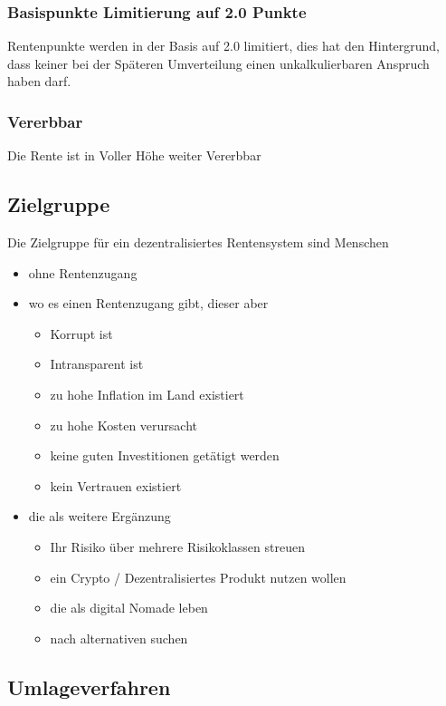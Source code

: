 \subsubsection*{Basispunkte Limitierung auf 2.0 Punkte}

Rentenpunkte werden in der Basis auf 2.0 limitiert, dies hat den Hintergrund, dass keiner bei der Späteren Umverteilung einen unkalkulierbaren Anspruch haben darf.

\subsubsection*{Vererbbar}

Die Rente ist in Voller Höhe weiter Vererbbar




\subsection{Zielgruppe}

Die Zielgruppe für ein dezentralisiertes Rentensystem sind Menschen

\begin{itemize}
\item ohne Rentenzugang
\item wo es einen Rentenzugang gibt, dieser aber 
 \begin{itemize}
 \item Korrupt ist
 \item Intransparent ist
 \item zu hohe Inflation im Land existiert
 \item zu hohe Kosten verursacht
 \item keine guten Investitionen getätigt werden
 \item kein Vertrauen existiert
 \end{itemize}
\item die als weitere Ergänzung 
 \begin{itemize}
 \item Ihr Risiko über mehrere Risikoklassen streuen
 \item ein Crypto / Dezentralisiertes Produkt nutzen wollen
 \item die als digital Nomade leben
 \item nach alternativen suchen
 \end{itemize}
\end{itemize}

\subsection{Umlageverfahren}

